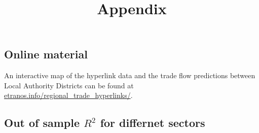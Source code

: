 \documentclass[
]{article}
\title{Appendix}
\author{}
\date{\vspace{-2.5em}}
\begin{document}
\maketitle

\hypertarget{online-material}{%
\subsection{Online material}\label{online-material}}

An interactive map of the hyperlink data and the trade flow predictions
between Local Authority Districts can be found at
\href{https://etranos.info/regional_trade_hyperlinks/}{etranos.info/regional\_trade\_hyperlinks/}.

\hypertarget{out-of-sample-r2-for-differnet-sectors}{%
\subsection{\texorpdfstring{Out of sample \(R^2\) for differnet
sectors}{Out of sample R\^{}2 for differnet sectors}}\label{out-of-sample-r2-for-differnet-sectors}}
\end{document}
